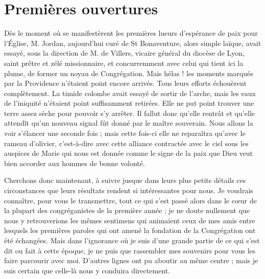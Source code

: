 \section*{Premières ouvertures}
Dès le moment où se manifestèrent les premières lueurs d'espérance de paix pour l'Église, M. Jordan, aujourd'hui curé de St Bonaventure, alors simple laïque, avait essayé, sous la direction de M. de Villers, vicaire général du diocèse de Lyon, saint prêtre et zélé missionnaire, et concurremment avec celui qui tient ici la plume, de former un noyau de Congrégation. Mais hélas ! les moments marqués par la Providence n'étaient point encore arrivés. Tous leurs efforts échouèrent complètement. La timide colombe avait essayé de sortir de l'arche, mais les eaux de
l'iniquité n'étaient point suffisamment retirées. Elle ne put point trouver une terre assez sèche pour pouvoir s'y arrêter. Il fallut donc qu'elle rentrât et qu'elle attendît qu'un nouveau signal fût donné par le maître souverain. Nous allons la voir s'élancer une seconde fois ; mais cette fois-ci elle ne reparaîtra qu'avec le rameau d'olivier, c'est-à-dire avec cette alliance contractée avec le ciel sous les auspices de Marie qui nous est donnée comme le signe de la paix que Dieu veut bien accorder aux hommes de bonne volonté.

Cherchons donc maintenant, à suivre jusque dans leurs plus petits détails ces circonstances que leurs résultats rendent si intéressantes pour nous. Je voudrais connaître, pour vous le transmettre, tout ce qui s'est passé alors dans le cœur de la plupart des congréganistes de la première année ; je ne doute nullement que nous y retrouverions les mêmes sentimens qui animaient ceux de mes amis entre lesquels les premières paroles qui ont amené la fondation de la Congrégation ont été échangées. Mais dans l'ignorance où je suis d'une grande partie de ce qui s'est dit ou fait à cette époque, je ne puis que rassembler mes souvenirs pour vous les faire parcourir avec moi. D'autres lignes ont pu aboutir au même centre ; mais je suis certain que celle-là nous y conduira directement.

